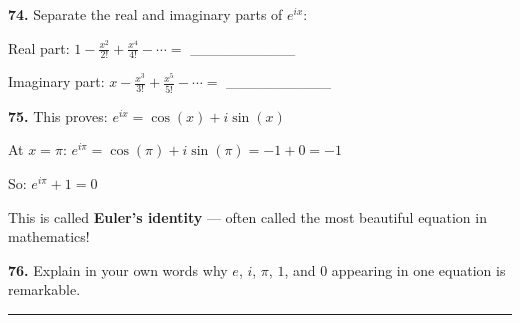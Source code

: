 \documentclass[
  11pt,
]{article}
\begin{document}
\textbf{74.} Separate the real and imaginary parts of \(e^{ix}\):

Real part: \(1 - \frac{x^2}{2!} + \frac{x^4}{4!} - \cdots ={}\)
\_\_\_\_\_\_\_\_\_\_

Imaginary part: \(x - \frac{x^3}{3!} + \frac{x^5}{5!} - \cdots ={}\)
\_\_\_\_\_\_\_\_\_\_

\textbf{75.} This proves: \(e^{ix} = \cos(x) + i\sin(x)\)

At \(x = \pi\): \(e^{i\pi} = \cos(\pi) + i\sin(\pi) = -1 + 0 = -1\)

So: \(e^{i\pi} + 1 = 0\)

This is called \textbf{Euler's identity} --- often called the most
beautiful equation in mathematics!

\textbf{76.} Explain in your own words why \(e\), \(i\), \(\pi\), \(1\),
and \(0\) appearing in one equation is remarkable.

\begin{center}\rule{0.5\linewidth}{0.5pt}\end{center}
\end{document}
